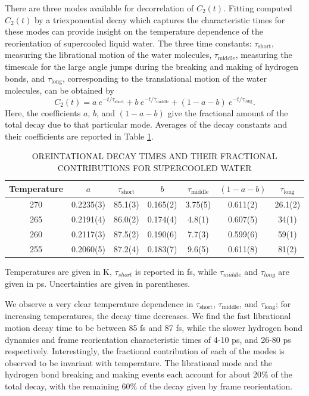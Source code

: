 There are three modes available for decorrelation of $C_2(t)$. Fitting
computed $C_2(t)$ by a triexponential decay which captures the
characteristic times for these modes can provide insight on the
temperature dependence of the reorientation of supercooled liquid
water. The three time constants: $\tau_\mathrm{short}$, measuring the
librational motion of the water molecules, $\tau_\mathrm{middle}$,
measuring the timescale for the large angle jumps during the breaking
and making of hydrogen bonds, and $\tau_\mathrm{long}$, corresponding
to the translational motion of the water molecules, can be obtained
by\cite{Louden2013a}
\begin{equation}
  C_{2}(t) = a~e^{-t/\tau_\mathrm{short}} + b~e^{-t/\tau_\mathrm{middle}} + 
  (1-a-b)~e^{-t/\tau_\mathrm{long}}.
\label{eq:c2}
\end{equation}
Here, the coefficients $a$, $b$, and $(1-a-b)$ give the fractional
amount of the total decay due to that particular mode. Averages of the
decay constants and their coefficients are reported in Table
\ref{tab:supOrient}.


\begin{table}[h] \centering \caption{OREINTATIONAL DECAY TIMES AND
    THEIR FRACTIONAL CONTRIBUTIONS FOR SUPERCOOLED WATER\label{tab:supOrient}}
\begin{tabular}{ccccccc}
\hline
\hline
 Temperature & $a$ & $\tau_\mathrm{short}$& $b$ &
                                                  $\tau_\mathrm{middle}$
  & $(1-a-b)$ & $\tau_\mathrm{long}$\\
\hline
270 &0.2235(3) &85.1(3) & 0.165(2) & 3.75(5) & 0.611(2) & 26.1(2)\\
265 &0.2191(4) &86.0(2) & 0.174(4) & 4.8(1) & 0.607(5) & 34(1)\\
260 &0.2117(3) &87.5(2) & 0.190(6) & 7.7(3) & 0.599(6) & 59(1)\\
255 &0.2060(5) &87.2(4) & 0.183(7) & 9.6(5) & 0.611(8) & 81(2)\\
\hline
\hline
\end{tabular}
\begin{flushleft}
Temperatures are given in K, $\tau_{short}$ is reported in fs, while $\tau_{middle}$ and
$\tau_{long}$ are given in ps. Uncertainties are given in parentheses.
\end{flushleft}
\end{table}

We observe a very clear temperature dependence in
$\tau_\mathrm{short}$, $\tau_\mathrm{middle}$, and
$\tau_\mathrm{long}$; for increasing temperatures, the decay time
decreases. We find the fast librational motion decay time to be
between 85 fs and 87 fs, while the slower hydrogen bond dynamics and
frame reorientation characteristic times of 4-10 ps, and 26-80 ps
respectively.  Interestingly, the fractional contribution of each of
the modes is observed to be invariant with temperature. The
librational mode and the hydrogen bond breaking and making events each
account for about 20$\%$ of the total decay, with the remaining 60$\%$
of the decay given by frame reorientation.


